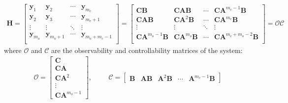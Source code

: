 \documentclass[letterpaper,10pt,english]{sphinxmanual}
\begin{document}
\begin{equation*}
\begin{split}\mathbf{H}
=
\begin{bmatrix}
    \mathbf{y}_{1}     & \mathbf{y}_{2}        & \cdots   & \mathbf{y}_{m_{c}}          \\
    \mathbf{y}_{2}     & \mathbf{y}_{3}        & \cdots   & \mathbf{y}_{m_{c}+1}        \\
    \vdots             & \vdots                & \ddots   & \vdots                      \\
    \mathbf{y}_{m_{o}} & \mathbf{y}_{m_{o}+1}  & \cdots   & \mathbf{y}_{m_{o}+m_{c}-1}  \\
\end{bmatrix}
=
\begin{bmatrix}
    \mathbf{CB}                     & \mathbf{CAB}                  & \cdots  & \mathbf{CA}^{m_{c}-1}\mathbf{B}       \\
    \mathbf{CAB}                    & \mathbf{CA}^{2}\mathbf{B}     & \cdots  & \mathbf{CA}^{m_{c}}\mathbf{B}         \\
    \vdots                          & \vdots                        & \ddots  & \vdots                                \\
    \mathbf{CA}^{m_{o}-1}\mathbf{B} & \mathbf{CA}^{m_{o}}\mathbf{B} & \cdots  & \mathbf{CA}^{m_{c}+m_{o}-2}\mathbf{B} \\
\end{bmatrix}
=
\mathbf{\mathcal{OC}}\end{split}
\end{equation*}
\sphinxAtStartPar
where \(\mathbf{\mathcal{O}}\) and \(\mathbf{\mathcal{C}}\) are
the observability and controllability matrices of the system:
\begin{equation*}
\begin{split}\mathbf{\mathcal{O}} = \begin{bmatrix}
    \mathbf{C} \\ \mathbf{CA} \\ \mathbf{CA}^{2} \\ \vdots \\ \mathbf{CA}^{m_{o}-1}
\end{bmatrix}, \hspace{1cm}
\mathbf{\mathcal{C}} = \begin{bmatrix} \mathbf{B} & \mathbf{AB} & \mathbf{A}^{2}\mathbf{B} & \cdots & \mathbf{A}^{m_{c}-1}\mathbf{B}  \end{bmatrix}\end{split}
\end{equation*}
\end{document}
